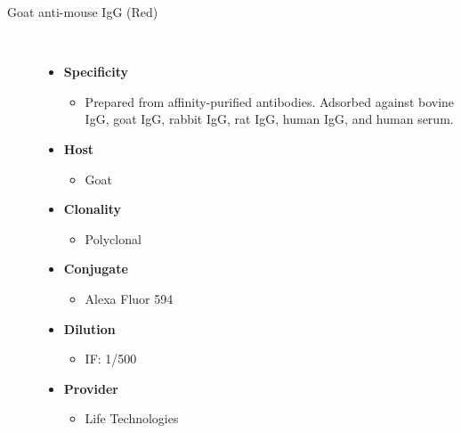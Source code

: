 \begin{description}
\item[Goat anti-mouse IgG (Red)]~\par  
   \begin{itemize}
      \item[] \textbf{Specificity}
      \begin{itemize}
         \item[] Prepared from affinity-purified antibodies. Adsorbed against bovine IgG, goat IgG, rabbit IgG, rat IgG, human IgG, and human serum. 
      \end{itemize}
      \item[] \textbf{Host}
      \begin{itemize}
      \item[] Goat
      \end{itemize}
            \item[] \textbf{Clonality}
      \begin{itemize}
      \item[] Polyclonal
      \end{itemize}
            \item[] \textbf{Conjugate}
      \begin{itemize}
      \item[]Alexa Fluor\textsuperscript{\textregistered} 594 
      \end{itemize}
                  \item[] \textbf{Dilution}
      \begin{itemize}
      \item[]IF: 1/500 
      \end{itemize}       
                  \item[] \textbf{Provider}
      \begin{itemize}
      \item[] Life Technologies
      \end{itemize}     
   \end{itemize}
   

\end{description}

